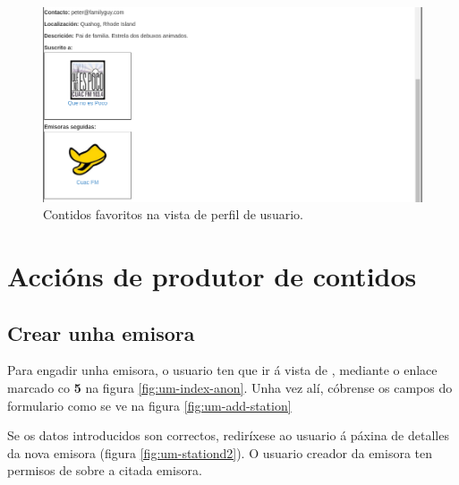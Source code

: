 \begin{figure}[h]
	\centering
	\includegraphics[scale=0.45,keepaspectratio=true]{./images/usermanual/um-userd2.png}
	\caption{Contidos favoritos na vista de perfil de usuario.}
	\label{fig:um-userd2}
\end{figure}


\section{Accións de produtor de contidos}

\subsection{Crear unha emisora}

Para engadir unha emisora, o usuario ten que ir á vista de , mediante o enlace marcado co \textbf{5} na figura 	\ref{fig:um-index-anon}. Unha vez alí, cóbrense os campos do formulario como se ve na figura \ref{fig:um-add-station}

Se os datos introducidos son correctos, rediríxese ao usuario á páxina de detalles da nova emisora (figura \ref{fig:um-stationd2}). O usuario creador da emisora ten permisos de  sobre a citada emisora.

